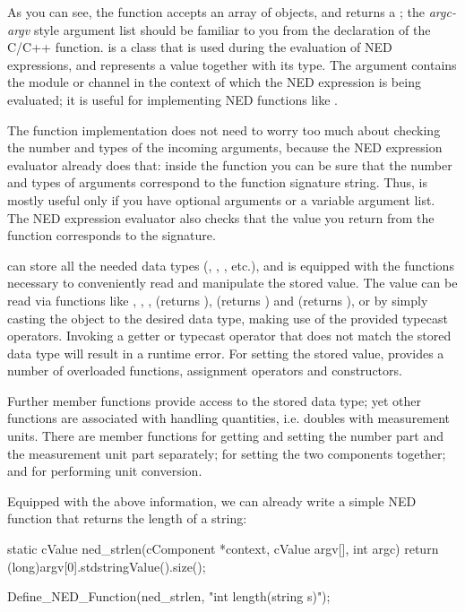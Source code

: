 As you can see, the function accepts an array of 
objects, and returns a ; the \textit{argc-argv} style
argument list should be familiar to you from the declaration of the C/C++
 function.  is a class that is used during
the evaluation of NED expressions, and represents a value together with its
type.  The  argument contains the module or channel in the
context of which the NED expression is being evaluated; it is useful for
implementing NED functions like .

The function implementation does not need to worry too much about checking
the number and types of the incoming arguments, because the NED expression
evaluator already does that: inside the function you can be sure that the
number and types of arguments correspond to the function signature string.
Thus,  is mostly useful only if you have optional arguments or a
variable argument list. The NED expression evaluator also checks that the
value you return from the function corresponds to the signature.

 can store all the needed data types (,
, , etc.), and is equipped with the functions
necessary to conveniently read and manipulate the stored value. The value can
be read via functions like , ,
,  (returns ),
 (returns ) and
 (returns ), or by simply casting the
object to the desired data type, making use of the provided typecast
operators. Invoking a getter or typecast operator that does not match the
stored data type will result in a runtime error. For setting the stored
value,  provides a number of overloaded 
functions, assignment operators and constructors.

Further  member functions provide access to the stored
data type; yet other functions are associated with handling quantities,
i.e. doubles with measurement units. There are member functions for getting
and setting the number part and the measurement unit part separately; for
setting the two components together; and for performing unit conversion.

Equipped with the above information, we can already write a simple NED function
that returns the length of a string:

\begin{cpp}
static cValue ned_strlen(cComponent *context, cValue argv[], int argc)
{
    return (long)argv[0].stdstringValue().size();
}

Define_NED_Function(ned_strlen, "int length(string s)");
\end{cpp}

